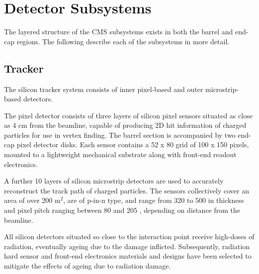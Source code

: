 \section{Detector Subsystems}  %
\label{sec:detector_subsystems}

The layered structure of the CMS subsystems exists in both the barrel and
end-cap regions. The following describe each of the subsystems in more detail.

\subsection{Tracker}



The silicon tracker system consists of inner pixel-based and outer microstrip-
based detectors.

The pixel detector consists of three layers of silicon pixel sensors situated 
as close as 4 cm from the beamline, capable 
of producing 2D hit information of charged particles for use in vertex 
finding. The barrel section is accompanied by two end-cap pixel detector 
disks. Each sensor contains a 52 x 80 grid of 100 \microm x 150 \microm pixels, 
mounted to a lightweight mechanical substrate along with front-end readout 
electronics.

A further 10 layers of silicon microstrip detectors are used to accurately 
reconstruct the track path of charged particles. The sensors collectively cover 
an area of over 200 $\text{m}^2$, are of p-in-n type, and range from 320 \microm
to 500 \microm in thickness and pixel pitch ranging between 80 \microm and 
205 \microm, depending on distance from the beamline.

All silicon detectors situated so close to the interaction point receive
high-doses of radiation, eventually ageing due to the damage inflicted. Subsequently, 
radiation hard sensor and front-end electronics materials and designs have been
selected to mitigate the effects of ageing due to radiation damage.

